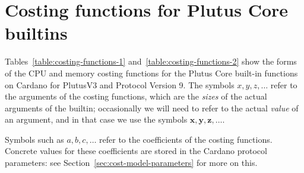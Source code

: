 \documentclass[a4paper]{article}
\begin{document}
\section{Costing functions for Plutus Core builtins}
Tables~\ref{table:costing-functions-1} and~\ref{table:costing-functions-2} show
the forms of the CPU and memory costing functions for the Plutus Core built-in
functions on Cardano for PlutusV3 and Protocol Version 9.  The symbols $x, y, z,
\ldots$ refer to the arguments of the costing functions, which are the
\textit{sizes} of the actual arguments of the builtin; occasionally we will need
to refer to the actual \textit{value} of an argument, and in that case we use
the symbols $\mathbf{x}, \mathbf{y}, \mathbf{z}, \ldots$.

Symbols such as $a, b, c, \ldots$ refer to the coefficients of the costing
functions.  Concrete values for these coefficients are stored in the Cardano
protocol parameters: see Section~\ref{sec:cost-model-parameters} for more on
this.
%
\end{document}
